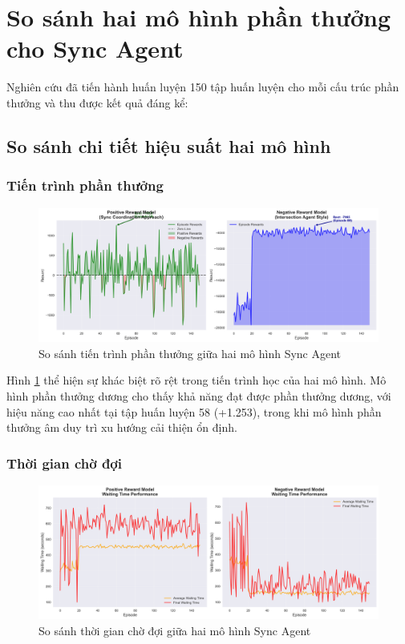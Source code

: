 \section{So sánh hai mô hình phần thưởng cho Sync Agent}

Nghiên cứu đã tiến hành huấn luyện 150 tập huấn luyện cho mỗi cấu trúc phần thưởng và thu được kết quả đáng kể:

\subsection{So sánh chi tiết hiệu suất hai mô hình}

\subsubsection{Tiến trình phần thưởng}

\begin{figure}[!htp]
    \centering
    \includegraphics[width=\textwidth]{figures/sync_reward_comparison.png}
    \caption{So sánh tiến trình phần thưởng giữa hai mô hình Sync Agent}
    \label{fig:sync_reward_comparison}
\end{figure}

Hình \ref{fig:sync_reward_comparison} thể hiện sự khác biệt rõ rệt trong tiến trình học của hai mô hình. Mô hình phần thưởng dương cho thấy khả năng đạt được phần thưởng dương, với hiệu năng cao nhất tại tập huấn luyện 58 (+1.253), trong khi mô hình phần thưởng âm duy trì xu hướng cải thiện ổn định.

\subsubsection{Thời gian chờ đợi}

\begin{figure}[!htp]
    \centering
    \includegraphics[width=\textwidth]{figures/sync_waiting_time_comparison.png}
    \caption{So sánh thời gian chờ đợi giữa hai mô hình Sync Agent}
    \label{fig:sync_waiting_time_comparison}
\end{figure}

